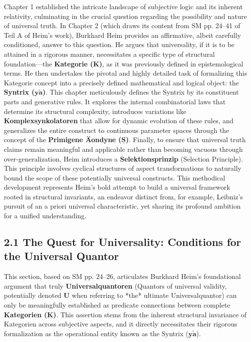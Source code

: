 \documentclass[12pt]{article}
\newcommand{\kategorie}{\bm{K}}
\newcommand{\syntrix}{\bm{y\widetilde{a}}}
\newcommand{\universalquantor}{\bm{U}}
\begin{document}
Chapter 1 established the intricate landscape of subjective logic and its inherent relativity, culminating in the crucial question regarding the possibility and nature of universal truth. In Chapter 2 (which draws its content from SM pp. 24–41 of Teil A of Heim's work), Burkhard Heim provides an affirmative, albeit carefully conditioned, answer to this question. He argues that universality, if it is to be attained in a rigorous manner, necessitates a specific type of structural foundation—the \textbf{Kategorie (\(\kategorie\))}, as it was previously defined in epistemological terms. He then undertakes the pivotal and highly detailed task of formalizing this Kategorie concept into a precisely defined mathematical and logical object: the \textbf{Syntrix (\(\syntrix\))}. This chapter meticulously defines the Syntrix by its constituent parts and generative rules. It explores the internal combinatorial laws that determine its structural complexity, introduces variations like \textbf{Komplexsynkolatoren} that allow for dynamic evolution of these rules, and generalizes the entire construct to continuous parameter spaces through the concept of the \textbf{Primigene \"{A}ondyne (\(\underline{\bm{S}}\))}. Finally, to ensure that universal truth claims remain meaningful and applicable rather than becoming vacuous through over-generalization, Heim introduces a \textbf{Selektionsprinzip} (Selection Principle). This principle involves cyclical structures of aspect transformations to naturally bound the scope of these potentially universal constructs. This methodical development represents Heim's bold attempt to build a universal framework rooted in structural invariants, an endeavor distinct from, for example, Leibniz's pursuit of an a priori universal characteristic, yet sharing its profound ambition for a unified understanding.

\subsection{2.1 The Quest for Universality: Conditions for the Universal Quantor}
\label{sec:universal_quantor_conditions}

This section, based on SM pp. 24--26, articulates Burkhard Heim's foundational argument that truly \textbf{Universalquantoren} (Quantors of universal validity, potentially denoted \( \universalquantor \) when referring to *the* ultimate Universalquantor) can only be meaningfully established as predicate connections between complete \textbf{Kategorien (\(\kategorie\))}. This assertion stems from the inherent structural invariance of Kategorien across subjective aspects, and it directly necessitates their rigorous formalization as the operational entity known as the Syntrix (\(\syntrix\)).
\end{document}
